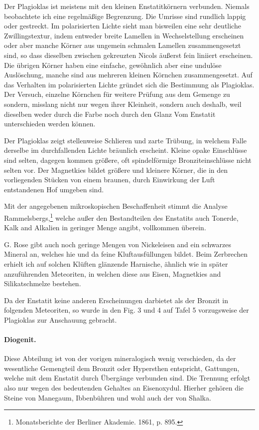 \documentclass[a4paper, 12pt, oneside]{article}
\begin{document}
Der Plagioklas ist meistens mit den kleinen Enstatitkörnern verbunden. Niemals beobachtete ich eine regelmäßige Begrenzung. Die Umrisse sind rundlich lappig oder gestreckt. Im polarisierten Lichte sieht man bisweilen eine sehr deutliche Zwillingstextur, indem entweder breite Lamellen in Wechselstellung erscheinen oder aber manche Körner aus ungemein schmalen Lamellen zusammengesetzt sind, so dass dieselben zwischen gekreuzten Nicols äußerst fein liniiert erscheinen. Die übrigen Körner haben eine einfache, gewöhnlich aber eine undulöse Auslöschung, manche sind aus mehreren kleinen Körnchen zusammengesetzt. Auf das Verhalten im polarisierten Lichte gründet sich die Bestimmung als Plagioklas. Der Versuch, einzelne Körnchen für weitere Prüfung aus dem Gemenge zu sondern, misslang nicht nur wegen ihrer Kleinheit, sondern auch deshalb, weil dieselben weder durch die Farbe noch durch den Glanz Vom Enstatit unterschieden werden können.

Der Plagioklas zeigt stellenweise Schlieren und zarte Trübung, in welchem Falle derselbe im durchfallenden Lichte bräunlich erscheint. Kleine opake Einschlüsse sind selten, dagegen kommen größere, oft spindelförmige Bronziteinschlüsse nicht selten vor. Der Magnetkies bildet größere und kleinere Körner, die in den vorliegenden Stücken von einem braunen, durch Einwirkung der Luft entstandenen Hof umgeben sind.

Mit der angegebenen mikroskopischen Beschaffenheit stimmt die Analyse Rammelsbergs,\footnote{Monatsberichte der Berliner Akademie. 1861, p. 895.} welche außer den Bestandteilen des Enstatits auch Tonerde, Kalk and Alkalien in geringer Menge angibt, vollkommen überein.

G. Rose gibt auch noch geringe Mengen von Nickeleisen and ein schwarzes Mineral an, welches hie und da feine Kluftausfüllungen bildet. Beim Zerbrechen erhielt ich auf solchen Klüften glänzende Harnische, ähnlich wie in später anzuführenden Meteoriten, in welchen diese aus Eisen, Magnetkies and Silikatschmelze bestehen.

Da der Enstatit keine anderen Erscheinungen darbietet als der Bronzit in folgenden Meteoriten, so wurde in den Fig. 3 und 4 auf Tafel 5 vorzugsweise der Plagioklas zur Anschauung gebracht.

\paragraph{Diogenit.} Diese Abteilung ist von der vorigen mineralogisch wenig verschieden, da der wesentliche Gemengteil dem Bronzit oder Hypersthen entspricht, Gattungen, welche mit dem Enstatit durch Übergänge verbunden sind. Die Trennung erfolgt also nur wegen des bedeutenden Gehaltes an Eisenoxydul. Hierher gehören die Steine von Manegaum, Ibbenbühren und wohl auch der von Shalka.
\end{document}
